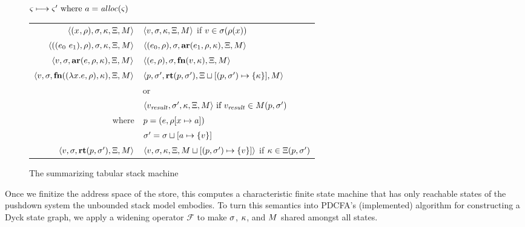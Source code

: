 \documentclass{llncs}
\begin{document}
\begin{figure}
  \centering
  $\varsigma \longmapsto \varsigma' \text{ where } a = \mathit{alloc}(\varsigma)$ \\
  \begin{tabular}{r|l}
    \hline
    $\langle (x^{{}}, \rho), \sigma, \kappa, \Xi, M \rangle$
    &
    $\langle v,\sigma,\kappa, \Xi, M \rangle$ if $v \in \sigma(\rho(x))$
    \\
    $\langle ((e_{0}\ e_{1}){}, \rho), \sigma, \kappa, \Xi, M \rangle$
    &
    $\langle (e_{0}, \rho), \sigma, \mathbf{ar}{}(e_{1},\rho,\kappa), \Xi, M \rangle$
    \\
    $\langle v, \sigma, \mathbf{ar}{}(e,\rho,\kappa), \Xi, M \rangle$
    &
    $\langle (e, \rho), \sigma, \mathbf{fn}{}(v, \kappa), \Xi, M \rangle$
    \\
    $\langle v,\sigma,\mathbf{fn}{}((\lambda{} x. e, \rho), \kappa),\Xi,M \rangle$
    & %
    $\langle p,
          \sigma',
          \mathbf{rt}(p, \sigma'),
          \Xi\sqcup[(p, \sigma') \mapsto \{ \kappa \}],
          M \rangle$
\\
    & or \\
    & $\langle v_\mathit{result}, \sigma', \kappa, \Xi, M \rangle \text{ if } v_\mathit{result} \in M(p,\sigma')$
    \\ %
    where & $p = (e, \rho[x \mapsto a])$ \\
          & $\sigma' = \sigma\sqcup[a \mapsto \{ v \}]$
    \\
    $\langle v, \sigma, \mathbf{rt}(p,\sigma'), \Xi, M \rangle$
    &
    $\langle v, \sigma, \kappa, \Xi, M\sqcup[(p, \sigma') \mapsto \{ v \}] \rangle$
    if $\kappa \in \Xi(p, \sigma')$
  \end{tabular}
  \caption{The summarizing tabular stack machine}
  \label{fig:summary-semantics}
\end{figure}

Once we finitize the address space of the store, this computes a
characteristic finite state machine that has only reachable states of
the pushdown system the unbounded stack model embodies.
To turn this semantics into PDCFA's (implemented) algorithm for constructing a Dyck
state graph, we apply a widening operator ${\mathcal F}$ to make $\sigma$, $\kappa$,
and $M$ shared amongst all states.
\end{document}
